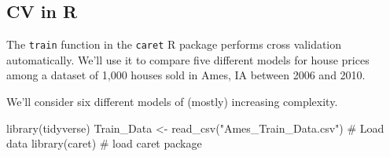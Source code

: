 \documentclass[
  letterpaper,
  DIV=11,
  numbers=noendperiod]{scrreprt}
\newenvironment{Shaded}{\begin{snugshade}}{\end{snugshade}}
\newcommand{\CommentTok}[1]{\textcolor[rgb]{0.37,0.37,0.37}{#1}}
\newcommand{\FunctionTok}[1]{\textcolor[rgb]{0.28,0.35,0.67}{#1}}
\newcommand{\NormalTok}[1]{\textcolor[rgb]{0.00,0.23,0.31}{#1}}
\newcommand{\OtherTok}[1]{\textcolor[rgb]{0.00,0.23,0.31}{#1}}
\newcommand{\StringTok}[1]{\textcolor[rgb]{0.13,0.47,0.30}{#1}}
\begin{document}
\subsection{CV in R}\label{cv-in-r}

The \texttt{train} function in the \texttt{caret} R package performs
cross validation automatically. We'll use it to compare five different
models for house prices among a dataset of 1,000 houses sold in Ames, IA
between 2006 and 2010.

We'll consider six different models of (mostly) increasing complexity.

\begin{Shaded}
\begin{Highlighting}[]
\FunctionTok{library}\NormalTok{(tidyverse)}
\NormalTok{Train\_Data }\OtherTok{\textless{}{-}} \FunctionTok{read\_csv}\NormalTok{(}\StringTok{"Ames\_Train\_Data.csv"}\NormalTok{)  }\CommentTok{\# Load data}
\FunctionTok{library}\NormalTok{(caret)   }\CommentTok{\# load caret package}
\end{Highlighting}
\end{Shaded}
\end{document}
